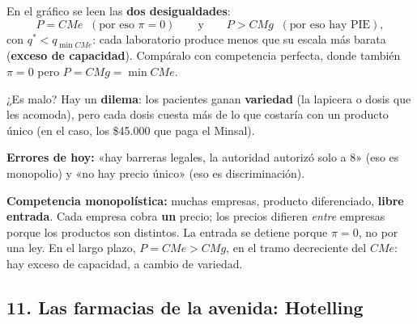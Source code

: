 \documentclass[11pt]{article}
\begin{document}
\begin{center}
\end{center}

En el gráfico se leen las \textbf{dos desigualdades}:
\[
P = CMe \;\;(\text{por eso } \pi = 0) \qquad\text{y}\qquad P > CMg \;\;(\text{por eso hay PIE}),
\]
con $q^{*} < q_{\min CMe}$: cada laboratorio produce menos que su escala más barata (\textbf{exceso de capacidad}). Compáralo con competencia perfecta, donde también $\pi = 0$ pero $P = CMg = \min CMe$.

¿Es malo? Hay un \textbf{dilema}: los pacientes ganan \textbf{variedad} (la lapicera o dosis que les acomoda), pero cada dosis cuesta más de lo que costaría con un producto único (en el caso, los \$45.000 que paga el Minsal).

\begin{error}
\textbf{Errores de hoy:} «hay barreras legales, la autoridad autorizó solo a 8» (eso es monopolio) y «no hay precio único» (eso es discriminación).
\end{error}
\begin{clave}
\textbf{Competencia monopolística:} muchas empresas, producto diferenciado, \textbf{libre entrada}. Cada empresa cobra \textbf{un} precio; los precios difieren \emph{entre} empresas porque los productos son distintos. La entrada se detiene porque $\pi = 0$, no por una ley. En el largo plazo, $P = CMe > CMg$, en el tramo decreciente del $CMe$: hay exceso de capacidad, a cambio de variedad.
\end{clave}

\subsection*{11. Las farmacias de la avenida: Hotelling}
\end{document}
